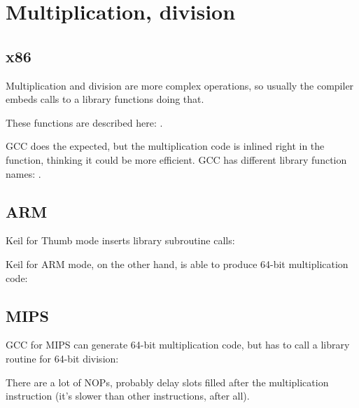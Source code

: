 ﻿\section{Multiplication, division}



\subsection{x86}



Multiplication and division are more complex operations, so usually the compiler embeds calls to
a library functions doing that.

These functions are described here: .

\ifdefined\IncludeGCC


GCC does the expected, but the multiplication
code is inlined right in the function, thinking it could be more efficient.
GCC has different library function names: .
\fi

\ifdefined\IncludeARM
\subsection{ARM}

Keil for Thumb mode inserts library subroutine calls:



Keil for ARM mode, on the other hand, is able to produce 64-bit multiplication code:


\fi

\ifdefined\IncludeMIPS
\subsection{MIPS}

\Optimizing GCC for MIPS can generate 64-bit multiplication code, but has to call a library routine for 64-bit division:



There are a lot of \ac{NOP}s, probably delay slots filled after the multiplication instruction (it's slower
than other instructions, after all).

\fi
